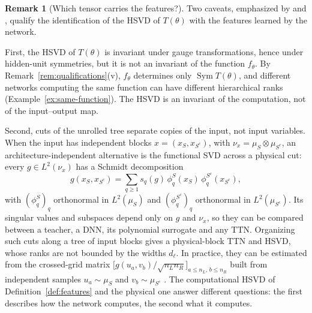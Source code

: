 \documentclass[11pt]{article}
\newcommand{\Sym}{\operatorname{Sym}}
\theoremstyle{definition}
\newtheorem{remark}[theorem]{Remark}
\numberwithin{equation}{section}
\begin{document}
\begin{remark}[Which tensor carries the features?]\label{rem:which-tensor}
Two caveats, emphasized by \citet[Section~8]{hfl_local} and \citet[Sections~3.4 and 7.4]{hfl_surrogate}, qualify the identification of the HSVD of $T(\theta)$ with the features learned by the network.

First, the HSVD of $T(\theta)$ is invariant under gauge transformations, hence under hidden-unit symmetries, but it is not an invariant of the function $f_\theta$. By Remark~\ref{rem:qualifications}(v), $f_\theta$ determines only $\Sym T(\theta)$, and different networks computing the same function can have different hierarchical ranks (Example~\ref{ex:same-function}). The HSVD is an invariant of the computation, not of the input--output map.

Second, cuts of the unrolled tree separate copies of the input, not input variables. When the input has independent blocks $x=(x_S,x_{S^c})$, with $\nu_x=\mu_S\otimes\mu_{S^c}$, an architecture-independent alternative is the functional SVD across a physical cut: every $g\in L^2(\nu_x)$ has a Schmidt decomposition
\[
g(x_S,x_{S^c})=\sum_{q\ge1}s_q(g)\,\phi^{S}_q(x_S)\,\phi^{S^c}_q(x_{S^c}),
\]
with $(\phi^S_q)_q$ orthonormal in $L^2(\mu_S)$ and $(\phi^{S^c}_q)_q$ orthonormal in $L^2(\mu_{S^c})$. Its singular values and subspaces depend only on $g$ and $\nu_x$, so they can be compared between a teacher, a DNN, its polynomial surrogate and any TTN. Organizing such cuts along a tree of input blocks gives a physical-block TTN and HSVD, whose ranks are not bounded by the widths $d_\ell$. In practice, they can be estimated from the crossed-grid matrix $\big[g(u_a,v_b)/\sqrt{n_Ln_R}\big]_{a\le n_L,\,b\le n_R}$ built from independent samples $u_a\sim\mu_S$ and $v_b\sim\mu_{S^c}$ \citep[Section~8.4]{hfl_local}. The computational HSVD of Definition~\ref{def:features} and the physical one answer different questions: the first describes how the network computes, the second what it computes.
\end{remark}
\end{document}
